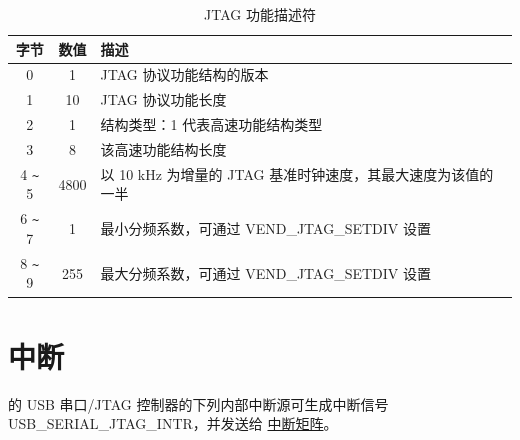 \documentclass[main\_\_CN.tex]{subfiles}
\begin{document}
\begin{table}[H]
\centering
\caption{JTAG 功能描述符}
\label{tab:usbserialjtag-capabilities-descriptor}

\begin{tabular}{ |c|c|l| } \hline
\rowcolor{lightgray}
\textbf{字节} & \textbf{数值} & \textbf{描述} \\\hline

0 & 1 & JTAG 协议功能结构的版本 \\\hline
1 & 10 & JTAG 协议功能长度 \\\hline
2 & 1 & 结构类型：1 代表高速功能结构类型 \\\hline
3 & 8 & 该高速功能结构长度 \\\hline
4 \verb+~+ 5 & 4800 & 以 10 kHz 为增量的 JTAG 基准时钟速度，其最大速度为该值的一半\\\hline
6 \verb+~+ 7 & 1 & 最小分频系数，可通过 VEND\_JTAG\_SETDIV 设置 \\\hline
8 \verb+~+ 9 & 255 & 最大分频系数，可通过 VEND\_JTAG\_SETDIV 设置 \\\hline
\end{tabular}
\end{table}

\section{中断}

\chipname{} 的 USB 串口/JTAG 控制器的下列内部中断源可生成中断信号 USB\_SERIAL\_JTAG\_INTR，并发送给 \hyperref[mod:intmtrx]{中断矩阵}。
\end{document}
